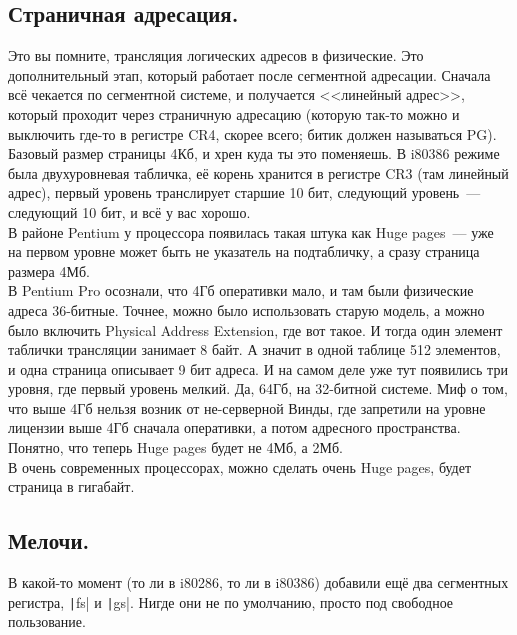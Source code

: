 \documentclass{article}
\begin{document}
    \subsection{Страничная адресация.}
    Это вы помните, трансляция логических адресов в физические. Это дополнительный этап, который работает после сегментной адресации. Сначала всё чекается по сегментной системе, и получается <<линейный адрес>>, который проходит через страничную адресацию (которую так-то можно и выключить где-то в регистре CR4, скорее всего; битик должен называться PG).\\
    Базовый размер страницы 4Кб, и хрен куда ты это поменяешь. В i80386 режиме была двухуровневая табличка, её корень хранится в регистре CR3 (там линейный адрес), первый уровень транслирует старшие 10 бит, следующий уровень~--- следующий 10 бит, и всё у вас хорошо.\\
    В районе Pentium у процессора появилась такая штука как Huge pages~--- уже на первом уровне может быть не указатель на подтабличку, а сразу страница размера 4Мб.\\
    В Pentium Pro осознали, что 4Гб оперативки мало, и там были физические адреса 36-битные. Точнее, можно было использовать старую модель, а можно было включить Physical Address Extension, где вот такое. И тогда один элемент таблички трансляции занимает 8 байт. А значит в одной таблице 512 элементов, и одна страница описывает 9 бит адреса. И на самом деле уже тут появились три уровня, где первый уровень мелкий. Да, 64Гб, на 32-битной системе. Миф о том, что выше 4Гб нельзя возник от не-серверной Винды, где запретили на уровне лицензии выше 4Гб сначала оперативки, а потом адресного пространства. Понятно, что теперь Huge pages будет не 4Мб, а 2Мб.\\
    В очень современных процессорах, можно сделать очень Huge pages, будет страница в гигабайт.
    \subsection{Мелочи.}
    В какой-то момент (то ли в i80286, то ли в i80386) добавили ещё два сегментных регистра, \texttt|fs| и \texttt|gs|. Нигде они не по умолчанию, просто под свободное пользование.
\end{document}
